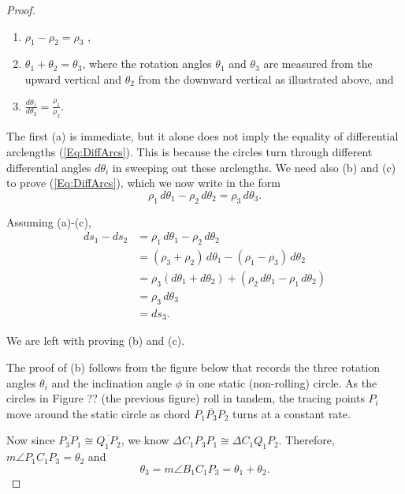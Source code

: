 \documentclass{ximera}
\begin{document}
\begin{proof}
\begin{enumerate}
\item  $\rho_1 - \rho_2 = \rho_3$ ,

\item $\theta_1 + \theta_2 = \theta_3$, where the rotation angles $\theta_1$ and $\theta_3$ are measured from the upward vertical and $\theta_2$ from the downward vertical as illustrated above, and %

\item $\frac{d\theta_1}{d\theta_2} = \frac{\rho_1}{\rho_2}$.
\end{enumerate}

The first (a) is immediate, but it alone does not imply the equality of differential arclengths (\ref{Eq:DiffArcs}). This is because the circles turn through different differential angles $d\theta_i$ in sweeping out these arclengths. We need also (b) and (c) to prove (\ref{Eq:DiffArcs}), which we now write in the form 
\[
       \rho_1 \, d\theta_1 - \rho_2 \, d\theta_2 = \rho_3 \, d\theta_3 .
\]


Assuming (a)-(c), 
\begin{align*}
     ds_1 - ds_2 &= \rho_1 \, d\theta_1 - \rho_2 \, d\theta_2 \\
                       &= (\rho_3 + \rho_2) \, d\theta_1 - (\rho_1 - \rho_3)\, d\theta_2 \\
                       &= \rho_3 (d\theta_1 + d\theta_2) + (\rho_2 \, d\theta_1 - \rho_1\, d\theta_2) \\
                       &= \rho_3 \, d\theta_3 \\
                       &= ds_3 .
\end{align*}

We are left with proving (b) and (c).     %

The proof of (b) follows from the figure below that records the three rotation angles $\theta_i$ and the inclination angle $\phi$ in one static (non-rolling) circle. As the circles in Figure ?? (the previous figure) roll in tandem, the tracing points $P_i$ move around the static circle as chord $\overline{P_1P_3P_2}$ turns at a constant rate.

Now since $\overline{P_3P_1}\cong \overline{Q_1P_2}$, we know $\Delta C_1P_3P_1\cong \Delta C_1Q_1P_2$. Therefore, $m\angle P_1C_1P_3 = \theta_2$ and 
\[
 \theta_3 = m \angle B_1C_1P_3 = \theta_1 + \theta_2.
\]



\end{proof}
\end{document}
